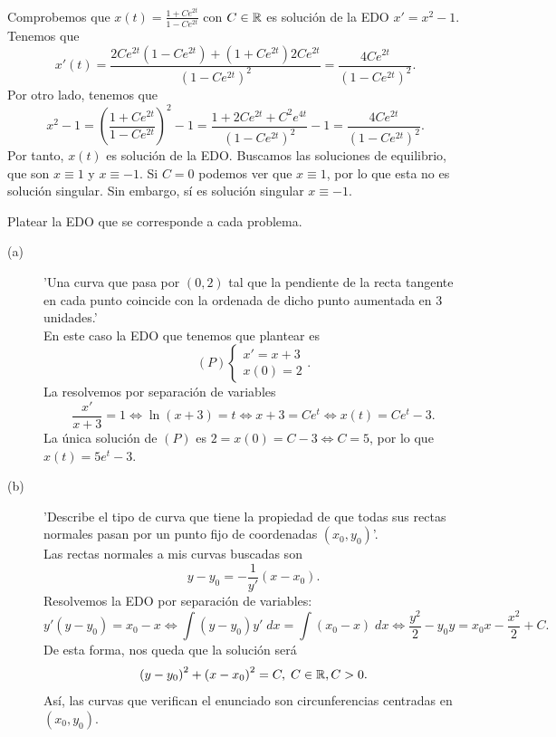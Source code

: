 \begin{eg}
Comprobemos que $\displaystyle x\left(t\right)= \frac{1+ Ce^{2t}}{1-Ce^{2t}} $ con $\displaystyle C \in \mathbb{R} $ es solución de la EDO $\displaystyle x' = x^{2}-1 $. Tenemos que 
\[x'\left(t\right)= \frac{2Ce^{2t}\left(1-Ce^{2t}\right)+\left(1+Ce^{2t}\right)2Ce^{2t}}{\left(1-Ce^{2t}\right)^{2}} = \frac{4Ce^{2t}}{\left(1-Ce^{2t}\right)^{2}} .\]
Por otro lado, tenemos que 
\[x^{2}-1 = \left(\frac{1 + Ce^{2t}}{1-Ce^{2t}}\right)^{2} - 1 = \frac{1 + 2Ce^{2t} + C^{2}e^{4t}}{\left(1-Ce^{2t}\right)^{2}}-1 = \frac{4Ce^{2t}}{\left(1-Ce^{2t}\right)^{2}}.\]
Por tanto, $\displaystyle x\left(t\right) $ es solución de la EDO. Buscamos las soluciones de equilibrio, que son $\displaystyle x \equiv 1 $ y $\displaystyle x \equiv - 1 $. Si $\displaystyle C = 0 $ podemos ver que $\displaystyle x \equiv 1 $, por lo que esta no es solución singular. Sin embargo, sí es solución singular $\displaystyle x \equiv -1 $. 
\end{eg}
\begin{eg} Platear la EDO que se corresponde a cada problema. 
	\begin{description}
	\item[(a)] 'Una curva que pasa por $\displaystyle \left(0,2\right) $ tal que la pendiente de la recta tangente en cada punto coincide con la ordenada de dicho punto aumentada en 3 unidades.' \\
	En este caso la EDO que tenemos que plantear es
	\[ \left(P\right)
	\begin{cases}
	x' = x + 3 \\
	x\left(0\right)=2
	\end{cases}
	.\]
	La resolvemos por separación de variables
	\[\frac{x'}{x+3}=1 \iff \ln\left(x+3\right)=t \iff x + 3 = Ce^{t} \iff x\left(t\right)=Ce^{t}-3 .\]
La única solución de $\displaystyle \left(P\right) $ es $\displaystyle 2 = x\left(0\right)=C-3 \iff C = 5 $, por lo que $\displaystyle x\left(t\right)=5e^{t}-3 $. 
\item[(b)] 'Describe el tipo de curva que tiene la propiedad de que todas sus rectas normales pasan por un punto fijo de coordenadas $\displaystyle \left(x_{0}, y_{0}\right) $'. \\
	Las rectas normales a mis curvas buscadas son
	\[y-y_{0}=-\frac{1}{y'}\left(x-x_{0}\right) .\]
	Resolvemos la EDO por separación de variables:
	\[y'\left(y-y_{0}\right)=x_{0}-x \iff \int \left(y-y_{0}\right)y' \; dx=\int \left(x_{0}-x\right) \; dx \iff \frac{y^{2}}{2}-y_{0}y=x_{0}x-\frac{x^{2}}{2}+C .\]
De esta forma, nos queda que la solución será
\[\left(y-y_{0}\right)^{2}+\left(x-x_{0}\right)^{2}=C, \; C \in \mathbb{R}, C > 0 .\]
Así, las curvas que verifican el enunciado son circunferencias centradas en $\displaystyle \left(x_{0}, y_{0}\right) $. 
	\end{description}
\end{eg}


